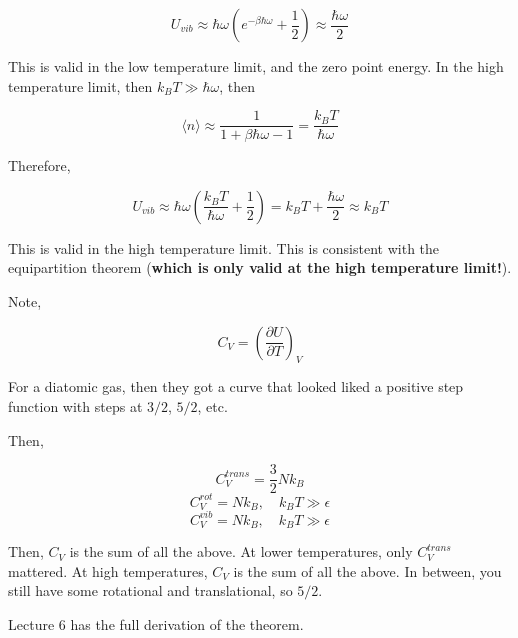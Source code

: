 \documentclass{article}
\newtheorem{one minute paper}[theorem]{One Minute Paper}
\begin{document}
\begin{equation}
    U_{vib} \approx \hbar \omega \left( e^{-\beta \hbar \omega} + \frac{1}{2} \right) \approx \frac{\hbar \omega}{2}
\end{equation}

This is valid in the low temperature limit, and the zero point energy. In the high temperature limit, then $k_B T \gg \hbar \omega$, then 

\begin{equation}
    \langle n \rangle \approx \frac{1}{1 + \beta \hbar \omega - 1} = \frac{k_B T}{\hbar \omega}
\end{equation}

Therefore, 

\begin{equation}
    U_{vib} \approx \hbar \omega \left( \frac{k_B T}{\hbar \omega} + \frac{1}{2} \right) = k_B T + \frac{\hbar \omega}{2} \approx k_B T
\end{equation}

This is valid in the high temperature limit. This is consistent with the equipartition theorem (\textbf{which is only valid at the high temperature limit!}).

Note, 

\begin{equation}
    C_V = \left( \frac{\partial U}{\partial T} \right)_{V}
\end{equation}

For a diatomic gas, then they got a curve that looked liked a positive step function with steps at $3/2$, $5/2$, etc. 

Then, 

\begin{equation}
    C_V^{trans} = \frac{3}{2}N k_B
\end{equation}
\begin{equation}
    C_V^{rot} = Nk_B, \quad k_B T \gg \epsilon
\end{equation}
\begin{equation}
    C_V^{vib} = Nk_B, \quad k_B T \gg \epsilon
\end{equation}

Then, $C_V$ is the sum of all the above. At lower temperatures, only $C_V^{trans}$ mattered. At high temperatures, $C_V$ is the sum of all the above. In between, you still have some rotational and translational, so $5/2$. 

Lecture 6 has the full derivation of the theorem. 
\end{document}
